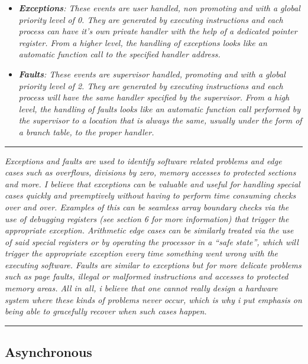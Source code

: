 \documentclass{article}
\begin{document}
            \begin{itemize}

                \item \textit{\textbf{Exceptions}: These events are user handled, non promoting and with a global priority level of 0. They are generated by executing instructions and each process can have it's own private handler with the help of a dedicated pointer register. From a higher level, the handling of exceptions looks like an automatic function call to the specified handler address.}

                \item \textit{\textbf{Faults}: These events are supervisor handled, promoting and with a global priority level of 2. They are generated by executing instructions and each process will have the same handler specified by the supervisor. From a high level, the handling of faults looks like an automatic function call performed by the supervisor to a location that is always the same, usually under the form of a branch table, to the proper handler.}

            \end{itemize}

        \par\noindent\rule{\textwidth}{0.4pt}
        \textit{Exceptions and faults are used to identify software related problems and edge cases such as overflows, divisions by zero, memory accesses to protected sections and more. I believe that exceptions can be valuable and useful for handling special cases quickly and preemptively without having to perform time consuming checks over and over. Examples of this can be seamless array boundary checks via the use of debugging registers (see section 6 for more information) that trigger the appropriate exception. Arithmetic edge cases can be similarly treated via the use of said special registers or by operating the processor in a ``safe state'', which will trigger the appropriate exception every time something went wrong with the executing software. Faults are similar to exceptions but for more delicate problems such as page faults, illegal or malformed instructions and accesses to protected memory areas. All in all, i believe that one cannot really design a hardware system where these kinds of problems never occur, which is why i put emphasis on being able to gracefully recover when such cases happen.}
        \par\noindent\rule{\textwidth}{0.4pt}

        \subsection{Asynchronous}
\end{document}
